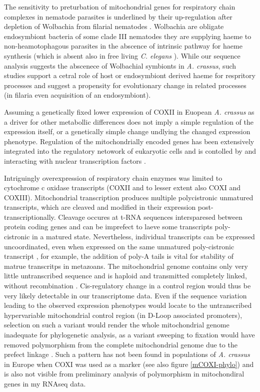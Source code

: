 The sensitivity to preturbation of mitochondrial genes for respiratory
chain complexes in nematode parasites is underlined by their
up-regulation after depletion of Wolbachia from filarial nematodes
\cite{pmid20362581, pmid19806204}. Wolbachia are obligate endosymbiont
bacteria of some clade III nematodes they are supplying haeme to
non-heamotophagous parasites in the abscence of intrinsic pathway for
haeme synthesis \cite{ghedin_draft_2007} (which is absent also in free
living \textit{C. elegans} \cite{pmid15767563}). While our sequence
analysis suggests the abscenece of Wolbachial symbionts in
\textit{A. crassus}, such studies support a cetral role of host or
endosymbiont derived haeme for respritory processes and suggest a
propensity for evolutionary change in related processes (in filaria
even acquisition of an endosymbiont).

Assuming a genetically fixed lower expression of COXII in Euopean
\textit{A. crassus} as a driver for other metabollic differences does
not imply a simple regulation of the expression itself, or a
genetically simple change undlying the changed expression
phenotype. Regulation of the mitochondrially encoded genes has been
extensively integrated into the regulatory netowork of eukaryotic
cells and is contolled by and interacting with nuclear transcription
factors \cite{pmid8289797}.

Intriguingly overexpression of respiratory chain enzymes was limited
to cytochrome c oxidase transcripts (COXII and to lesser extent also
COXI and COXIII). Mitochondrial transcription produces multiple
polycistronic unmatured transcripts, which are cleaved and modified in
their expression post-transcriptionally. Cleavage occures at t-RNA
sequences intersparesed between protein coding genes and can be
imprefect to laeve some transcripts poly-cistronic in a matured
state. Nevertheless, individual transcripts can be expressed
uncoordinated, even when expressed on the same unmatured
poly-cistronic transcript \cite{pmid19843606}, for example, the
addition of poly-A tails is vital for stability of matrue transcritps
in metazoans. The mitochondrial genome contains only very little
untranscribed sequence and is haploid and transmitted completely
linked, without recombination \cite{pmid18023115}. Cis-regulatory
change in a control region would thus be very likely detectable in our
transcriptome data. Even if the sequence variation leading to the
observed expression phenotypes would locate to the untranscribed
hypervariable mitochondrial control region (in D-Loop associated
promoters), selection on such a variant would render the whole
mitochondrial genome inadequate for phylogenetic analysis, as a
variant sweeping to fixation would have removed polymorphism from the
complete mitochondrial genome due to the prefect linkage
\cite{pmid19821901}. Such a pattern has not been found in populations
of \textit{A. crassus} in Europe when COXI was used as a marker
\cite{dl_py} (see also figure \ref{mCOXI-phylo}) and is also not
visible from preliminary analysis of polymorphism in mitochondiral
genes in my RNAseq data.

